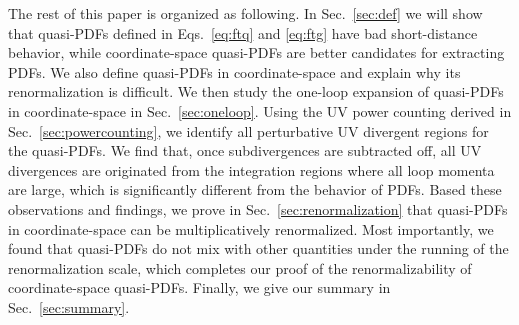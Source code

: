The rest of this paper is organized as following.
In Sec.~\ref{sec:def} we will show that quasi-PDFs defined in Eqs.~\eqref{eq:ftq} and \eqref{eq:ftg} have bad short-distance behavior, while coordinate-space quasi-PDFs are better candidates for extracting PDFs. We also define quasi-PDFs in coordinate-space and explain why its renormalization is difficult. We then study the one-loop expansion of quasi-PDFs in coordinate-space in Sec.~\ref{sec:oneloop}. Using the UV power counting derived in Sec.~\ref{sec:powercounting}, we identify all  perturbative UV divergent regions for the quasi-PDFs.  We find that, once subdivergences are subtracted off, all UV divergences are originated from the integration regions where all loop momenta are large, which is significantly different from the behavior of PDFs.
Based these observations and findings, we prove  in Sec.~\ref{sec:renormalization} that quasi-PDFs in coordinate-space can be multiplicatively renormalized. Most importantly, we found that quasi-PDFs do not mix with other quantities under the running of the renormalization scale, which completes our proof of the renormalizability of coordinate-space quasi-PDFs.  Finally, we give our summary in Sec.~\ref{sec:summary}.
